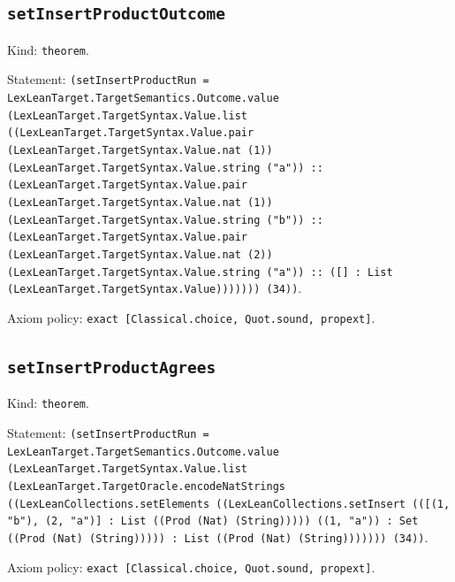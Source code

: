 \documentclass[11pt]{article}
\begin{document}
\subsection*{\texttt{setInsertProductOutcome}}
\noindent Kind: \texttt{theorem}.\par
\noindent Statement: \texttt{(setInsertProductRun = LexLeanTarget.TargetSemantics.Outcome.value (LexLeanTarget.TargetSyntax.Value.list ((LexLeanTarget.TargetSyntax.Value.pair (LexLeanTarget.TargetSyntax.Value.nat (1)) (LexLeanTarget.TargetSyntax.Value.string ("a")) :: (LexLeanTarget.TargetSyntax.Value.pair (LexLeanTarget.TargetSyntax.Value.nat (1)) (LexLeanTarget.TargetSyntax.Value.string ("b")) :: (LexLeanTarget.TargetSyntax.Value.pair (LexLeanTarget.TargetSyntax.Value.nat (2)) (LexLeanTarget.TargetSyntax.Value.string ("a")) :: ([] : List (LexLeanTarget.TargetSyntax.Value))))))) (34))}.\par
\noindent Axiom policy: \texttt{exact [Classical.choice, Quot.sound, propext]}.\par
\subsection*{\texttt{setInsertProductAgrees}}
\noindent Kind: \texttt{theorem}.\par
\noindent Statement: \texttt{(setInsertProductRun = LexLeanTarget.TargetSemantics.Outcome.value (LexLeanTarget.TargetSyntax.Value.list (LexLeanTarget.TargetOracle.encodeNatStrings ((LexLeanCollections.setElements ((LexLeanCollections.setInsert (([(1, "b"), (2, "a")] : List ((Prod (Nat) (String))))) ((1, "a")) : Set ((Prod (Nat) (String))))) : List ((Prod (Nat) (String))))))) (34))}.\par
\noindent Axiom policy: \texttt{exact [Classical.choice, Quot.sound, propext]}.\par
\end{document}
